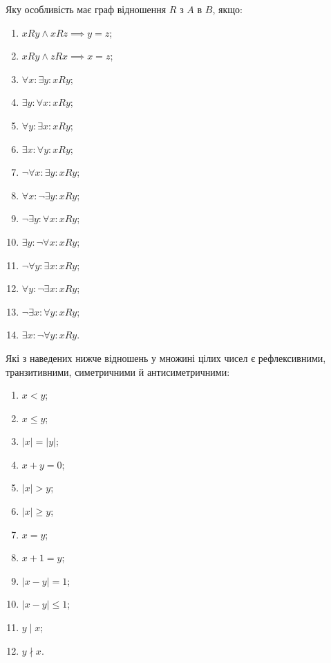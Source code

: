 \begin{problem}
	Яку особливість має граф відношення $R$ з $A$ в $B$, якщо:
	\begin{multicols}{2}
		\begin{enumerate}
			\item $x R y \land x R z \implies y = z$;
			\item $x R y \land z R x \implies x = z$;
		\end{enumerate}
	\end{multicols}
	\begin{multicols}{3}
		\begin{enumerate}
			\setcounter{enumi}{2}
			\item $\forall x: \exists y: x R y$;
			\item $\exists y: \forall x: x R y$;
			\item $\forall y: \exists x: x R y$;
			\item $\exists x: \forall y: x R y$;
			\item $\lnot \forall x: \exists y: x R y$;
			\item $\forall x: \lnot \exists y: x R y$;
			\item $\lnot \exists y: \forall x: x R y$;
			\item $\exists y: \lnot \forall x: x R y$;
			\item $\lnot \forall y: \exists x: x R y$;
			\item $\forall y: \lnot \exists x: x R y$;
			\item $\lnot \exists x: \forall y: x R y$;
			\item $\exists x: \lnot \forall y: x R y$.
		\end{enumerate}
	\end{multicols}
\end{problem}

\begin{problem}
	Які з наведених нижче відношень у множині цілих чисел є рефлексивними, транзитивними, симетричними й антисиметричними:
	\begin{multicols}{4}
		\begin{enumerate}
			\item $x < y$;
			\item $x \le y$;
			\item $|x| = |y|$;
			\item $x + y = 0$;
			\item $|x| > y$;
			\item $|x| \ge y $;
			\item $x = y$;
			\item $x + 1 = y$;
			\item $|x - y| = 1$;
			\item $|x - y| \le 1$;
			\item $y \mid x$;
			\item $y \nmid x$.
		\end{enumerate}
	\end{multicols}
\end{problem}

